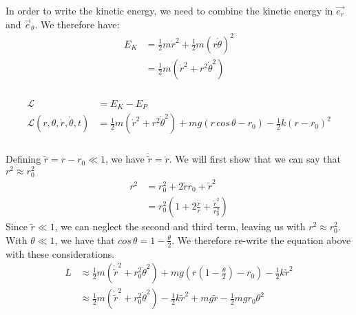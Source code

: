 \documentclass{article}
\begin{document}
\subsubsection{} %

In order to write the kinetic energy, we need to combine the kinetic energy in $\vec{e_r}$ and $\vec{e}_{\theta}$. We therefore have:
\begin{align*}
	E_K &= \frac{1}{2}m\dot{r}^2 + \frac{1}{2}m(r\dot{\theta})^2\\
	&= \frac{1}{2}m(\dot{r}^2 + r^2\dot{\theta}^2)
\end{align*}

\subsubsection{} %

\begin{align*}
	\mathcal{L} &= E_{K} - E_P\\
	\mathcal{L}(r,\theta,\dot{r},\dot{\theta},t) &= \frac{1}{2}m(\dot{r}^2 + r^2\dot{\theta}^2) + mg(r\,cos\,\theta - r_0) - \frac{1}{2}k(r-r_0)^2
\end{align*}

\subsubsection{} %

Defining $\tilde{r} = r - r_0 \ll 1$, we have $\dot{\tilde{r}} = \dot{r}$. We will first show that we can say that $r^2 \approx r_0^2$
\begin{align*}
	r^2 &= r_0^2 + 2\tilde{r}r_0 + \tilde{r}^2\\
	&= r_0^2\left( 1 + 2\frac{\tilde{r}}{r} +\frac{\tilde{r}^2}{r_0^2} \right)
\end{align*}
Since $\tilde{r} \ll 1$, we can neglect the second and third term, leaving us with $r^2 \approx r_0^2$.\\
With $\theta \ll 1$, we have that $cos\,\theta = 1 - \frac{\theta}{2}$. We therefore re-write the equation above with these considerations.
\begin{align*}
	L &\approx \frac{1}{2}m(\dot{\tilde{r}}^2 + r_0^2\dot{\theta}^2) + mg(r(1- \frac{\theta}{2})- r_0) - \frac{1}{2}k\tilde{r}^2\\
	&\approx \frac{1}{2}m(\dot{\tilde{r}}^2 + r_0^2\dot{\theta}^2)  - \frac{1}{2}k\tilde{r}^2 +mg\tilde{r} - \frac{1}{2}mgr_0\theta^2
\end{align*}
\end{document}
